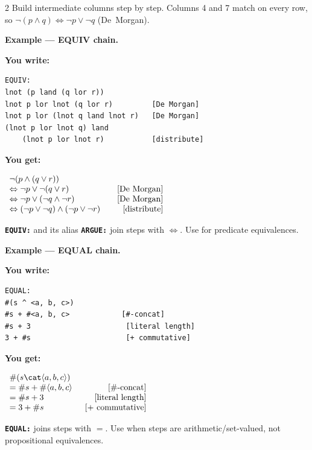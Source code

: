 \documentclass[10pt,landscape,a4paper]{article}
\newcommand{\kw}[1]{\texttt{\bfseries #1}}
\newenvironment{exwrite}%
  {\par\nobreak\noindent\scriptsize\textbf{You write:}\par\nobreak\vspace{0pt}\scriptsize}%
  {\vspace{1pt}\nobreak}
\newenvironment{exget}%
  {\par\nobreak\noindent\scriptsize\textbf{You get:}\par\nobreak\vspace{0pt}\small}%
  {\par\vspace{3pt}}
\begin{document}
\begin{multicols}{2}
{\scriptsize Build intermediate columns step by step.  Columns 4 and 7 match on every row, so $\lnot (p \land q) \Leftrightarrow \lnot p \lor \lnot q$ (De~Morgan).}

\textbf{Example — EQUIV chain.}

\begin{exwrite}%
\begin{verbatim}
EQUIV:
lnot (p land (q lor r))
lnot p lor lnot (q lor r)         [De Morgan]
lnot p lor (lnot q land lnot r)   [De Morgan]
(lnot p lor lnot q) land
    (lnot p lor lnot r)           [distribute]
\end{verbatim}
\end{exwrite}
\begin{exget}%
\begin{center}
$\begin{array}{l@{\hspace{2em}}r}
\lnot (p \land (q \lor r)) \\
\Leftrightarrow \lnot p \lor \lnot (q \lor r)
  & [\mbox{De Morgan}] \\
\Leftrightarrow \lnot p \lor (\lnot q \land \lnot r)
  & [\mbox{De Morgan}] \\
\Leftrightarrow (\lnot p \lor \lnot q) \land (\lnot p \lor \lnot r)
  & [\mbox{distribute}]
\end{array}$
\end{center}
\end{exget}

{\scriptsize \kw{EQUIV:} and its alias \kw{ARGUE:} join steps with $\Leftrightarrow$. Use for predicate equivalences.}

\textbf{Example — EQUAL chain.}

\begin{exwrite}%
\begin{verbatim}
EQUAL:
#(s ^ <a, b, c>)
#s + #<a, b, c>            [#-concat]
#s + 3                      [literal length]
3 + #s                      [+ commutative]
\end{verbatim}
\end{exwrite}
\begin{exget}%
\begin{center}
$\begin{array}{l@{\hspace{1.5em}}r}
\#(s \cat \langle a, b, c \rangle) \\
= \#s + \#\langle a, b, c \rangle & [\mbox{\#-concat}] \\
= \#s + 3 & [\mbox{literal length}] \\
= 3 + \#s & [\mbox{$+$ commutative}]
\end{array}$
\end{center}
\end{exget}

{\scriptsize \kw{EQUAL:} joins steps with $=$. Use when steps are arithmetic/set-valued, not propositional equivalences.}

\end{multicols}
\end{document}
